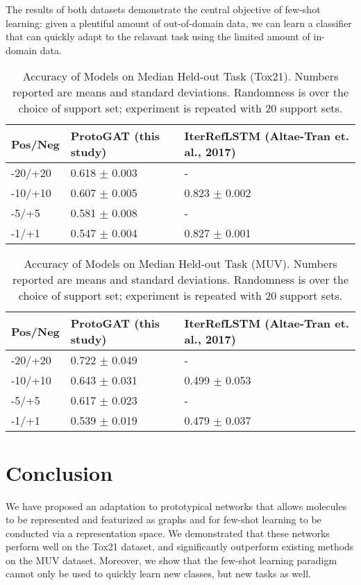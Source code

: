 \documentclass{article}
\begin{document}
The results of both datasets demonstrate the central objective of few-shot learning: given a plentiful amount of out-of-domain data, we can learn a classifier that can quickly adapt to the relavant task using the limited amount of in-domain data.

\begin{table}
  \caption{Accuracy of Models on Median Held-out Task (Tox21). Numbers reported are means and standard deviations. Randomness is over the choice of support set; experiment is repeated with 20 support sets.}
  \label{sample-table}
  \centering
  \begin{tabular}{lll}
    \toprule
    Pos/Neg & \textbf{ProtoGAT (this study)} & IterRefLSTM (Altae-Tran et. al., 2017) \\
    \midrule
    -20/+20 & 0.618 $\pm$ 0.003 & -     \\
    -10/+10 & 0.607 $\pm$ 0.005 & 0.823 $\pm$ 0.002      \\
    -5/+5   & 0.581 $\pm$ 0.008 & -  \\
    -1/+1   & 0.547 $\pm$ 0.004 & 0.827 $\pm$ 0.001  \\
    \bottomrule
  \end{tabular}
\end{table}

\begin{table}
  \caption{Accuracy of Models on Median Held-out Task (MUV). Numbers reported are means and standard deviations. Randomness is over the choice of support set; experiment is repeated with 20 support sets.}
  \label{sample-table}
  \centering
  \begin{tabular}{lll}
    \toprule
    Pos/Neg & \textbf{ProtoGAT (this study)} & IterRefLSTM (Altae-Tran et. al., 2017) \\
    \midrule
    -20/+20 & 0.722 $\pm$ 0.049 & -     \\
    -10/+10 & 0.643 $\pm$ 0.031 & 0.499 $\pm$ 0.053      \\
    -5/+5   & 0.617 $\pm$ 0.023 & -  \\
    -1/+1   & 0.539 $\pm$ 0.019 & 0.479 $\pm$ 0.037  \\
    \bottomrule
  \end{tabular}
\end{table}

\section{Conclusion}


We have proposed an adaptation to prototypical networks that allows molecules to be represented and featurized as graphs and for few-shot learning to be conducted via a representation space.  We demonstrated that these networks perform well on the Tox21 dataset, and significantly outperform existing methods on the MUV dataset.  Moreover, we show that the few-shot learning paradigm cannot only be used to quickly learn new classes, but new tasks as well.
\end{document}
